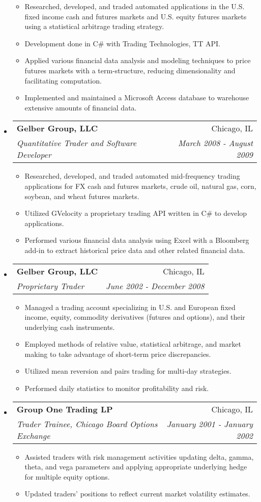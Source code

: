 \documentclass[letterpaper,10pt]{article}
\makeatletter
\newcommand{\resitem}[1]{\item #1 \vspace{-2pt}}
\newcommand{\ressubheading}[4]{
\begin{tabular*}{7.0in}{l@{\extracolsep{\fill}}r}
		\textbf{#1} & #2 \\
		\textit{#3} & \textit{#4} \\
\end{tabular*}\vspace{-6pt}}
\makeatother
\begin{document}
\begin{itemize}
\begin{itemize}
		\resitem{Researched, developed, and traded automated applications in the U.S. fixed income cash and 
   futures markets and U.S. equity futures markets using a statistical arbitrage trading strategy.}
		\resitem{Development done in C\# with Trading Technologies, TT API.}
		\resitem{Applied various financial data analysis and modeling techniques to price futures markets with 
   a term-structure, reducing dimensionality and facilitating computation.}
        \resitem{Implemented and maintained a Microsoft Access database to warehouse extensive amounts of financial data.}
	\end{itemize}
\item
	\ressubheading{Gelber Group, LLC}{Chicago, IL}{Quantitative Trader and Software Developer}{March 2008 - August 2009}
	\begin{itemize}
		\resitem{Researched, developed, and traded automated mid-frequency trading applications for FX cash and 
   futures markets, crude oil, natural gas, corn, soybean, and wheat futures markets.}
		\resitem{Utilized GVelocity a proprietary trading API written in C\# to develop applications.}
		\resitem{Performed various financial data analysis using Excel with a Bloomberg add-in to extract historical price data and other related financial data.}
	\end{itemize}

\item
	\ressubheading{Gelber Group, LLC}{Chicago, IL}{Proprietary Trader}{June 2002 - December 2008}
	\begin{itemize}
		\resitem{Managed a trading account specializing in U.S. and European fixed income, equity, commodity
   derivatives (futures and options), and their underlying cash instruments.}
		\resitem{Employed methods of relative value, statistical arbitrage, and market making to take advantage 
   of short-term price discrepancies.}
		\resitem{Utilized mean reversion and pairs trading for multi-day strategies.}
		\resitem{Performed daily statistics to monitor profitability and risk. }
	\end{itemize}

\item
	\ressubheading{Group One Trading LP}{Chicago, IL}{Trader Trainee, Chicago Board Options Exchange}{January 2001 - January 2002}
	\begin{itemize}
		\resitem{Assisted traders with risk management activities updating delta, gamma, theta, and vega
  parameters and applying appropriate underlying hedge for multiple equity options.}
		\resitem{Updated traders’ positions to reflect current market volatility estimates.}
	\end{itemize}

\end{itemize}
\end{document}
